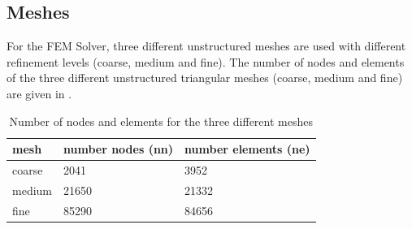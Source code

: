\subsection{Meshes}
For the FEM Solver, three different unstructured meshes are used with different refinement levels (coarse, medium and fine). The number of nodes and elements of the three different unstructured triangular meshes (coarse, medium and fine) are given in .
\renewcommand{\arraystretch}{2}
\begin{table}[h!]
	\begin{center}
		\begin{tabular}{ p{2cm} p{1.5cm} p{1.5cm} }
			\hline
			\hline
			mesh & number nodes (nn) & number elements (ne)\\
			\hline
			coarse & 2041 & 3952\\
			\hline
			medium & 21650 & 21332\\
			\hline
			fine & 85290 & 84656\\
			\hline
			\hline
		\end{tabular}
		\caption{\label{tab:Mesh} Number of nodes and elements for the three different meshes}
	\end{center}
\end{table}
\renewcommand{\arraystretch}{1}